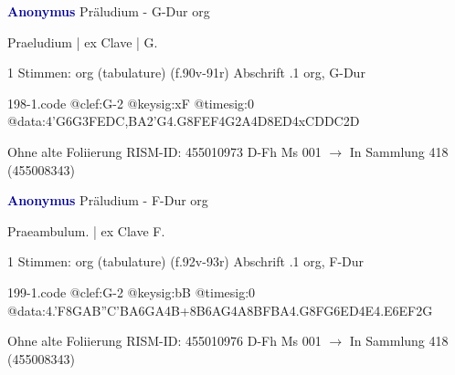 \documentclass[twocolumn]{book}
\begin{document}
\newline \par \vspace{7pt} \textcolor{darkblue}{\textbf{Anonymus  }}
\newline Präludium - G-Dur
\newline org
\newline \begin{itshape}[f.90v, at left:] Praeludium | ex Clave | G.\end{itshape} 
\newline \textcolor{darkblue}{}  1 Stimmen: org (tabulature)  (f.90v-91r)
\newline Abschrift
.1  org, G-Dur  
\begin{filecontents*}{198-1.code}
@clef:G-2
@keysig:xF
@timesig:0
@data:4'G{6G3FE}{DC,BA}2'G4.G8F{EF}4G2A4D{8ED}4xCDDC2D
\end{filecontents*}
\newline
%
\newline Ohne alte Foliierung
\newline RISM-ID: 455010973
\newline D-Fh  Ms 001
\newline $\rightarrow$ In Sammlung 418 (455008343)
      
\newline \par \vspace{7pt} \textcolor{darkblue}{\textbf{Anonymus  }}
\newline Präludium - F-Dur
\newline org
\newline \begin{itshape}[f.92v, at left:] Praeambulum. | ex Clave F.\end{itshape} 
\newline \textcolor{darkblue}{}  1 Stimmen: org (tabulature)  (f.92v-93r)
\newline Abschrift
.1  org, F-Dur  
\begin{filecontents*}{199-1.code}
@clef:G-2
@keysig:bB
@timesig:0
@data:4.'F8G{AB''C'B}{A6GA}4B+{8B6AG}4A{8BFBA}4.G8F{G6ED}4E4.E{6EF}2G
\end{filecontents*}
\newline
%
\newline Ohne alte Foliierung
\newline RISM-ID: 455010976
\newline D-Fh  Ms 001
\newline $\rightarrow$ In Sammlung 418 (455008343)
      
\end{document}
